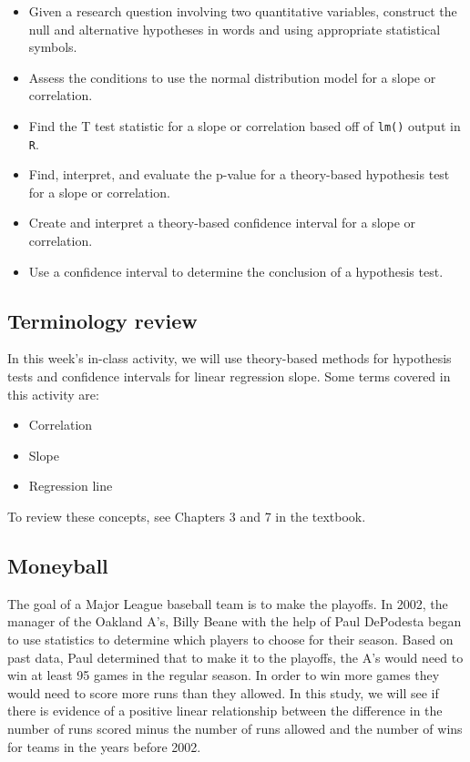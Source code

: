 \documentclass[
]{report}
\begin{document}
\begin{itemize}
\item
  Given a research question involving two quantitative variables, construct the null and alternative hypotheses
  in words and using appropriate statistical symbols.
\item
  Assess the conditions to use the normal distribution model for a slope or correlation.
\item
  Find the T test statistic for a slope or correlation based off of \texttt{lm()} output in \texttt{R}.
\item
  Find, interpret, and evaluate the p-value for a theory-based hypothesis test for a slope or correlation.
\item
  Create and interpret a theory-based confidence interval for a slope or correlation.
\item
  Use a confidence interval to determine the conclusion of a hypothesis test.
\end{itemize}

\hypertarget{terminology-review-11}{%
\subsection{Terminology review}\label{terminology-review-11}}

In this week's in-class activity, we will use theory-based methods for hypothesis tests and confidence intervals for linear regression slope. Some terms covered in this activity are:

\begin{itemize}
\item
  Correlation
\item
  Slope
\item
  Regression line
\end{itemize}

To review these concepts, see Chapters 3 and 7 in the textbook.

\hypertarget{moneyball}{%
\subsection{Moneyball}\label{moneyball}}

The goal of a Major League baseball team is to make the playoffs. In 2002, the manager of the Oakland A's, Billy Beane with the help of Paul DePodesta began to use statistics to determine which players to choose for their season. Based on past data, Paul determined that to make it to the playoffs, the A's would need to win at least 95 games in the regular season. In order to win more games they would need to score more runs than they allowed. In this study, we will see if there is evidence of a positive linear relationship between the difference in the number of runs scored minus the number of runs allowed and the number of wins for teams in the years before 2002.
\end{document}
